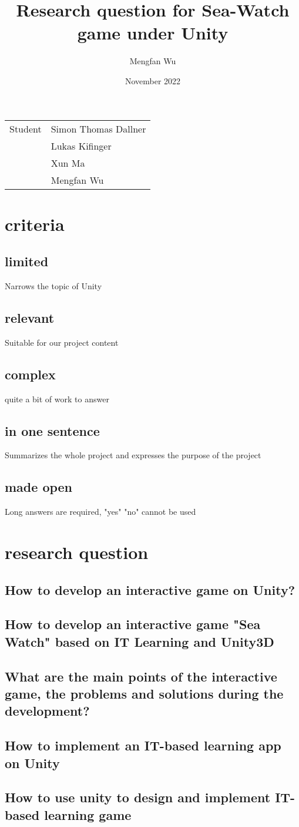 \documentclass{article}
\title{Research question for Sea-Watch game under Unity
}
\author{Mengfan Wu}
\date{November 2022}
\begin{document}
\maketitle

\noindent\begin{tabular}{@{}ll}
    Student &  Simon Thomas Dallner \\& Lukas Kifinger \\&  Xun Ma \\& Mengfan Wu
     
\end{tabular}

\section{criteria}

\subsection{limited}
Narrows the topic of Unity
\subsection{relevant}
Suitable for our project content

\subsection{complex}
quite a bit of work to answer

\subsection{in one sentence}
Summarizes the whole project and expresses the purpose of the project

\subsection{made open}
Long answers are required, "yes" "no" cannot be used


\section{research question}
\subsection{How to develop an interactive game on Unity?}

\subsection{How to develop an interactive game "Sea Watch" based on IT Learning and Unity3D}

\subsection{What are the main points of the interactive game, the problems and solutions during the development? }

\subsection{How to implement an IT-based learning app on Unity}
\subsection{How to use unity to design and implement IT-based learning game}
\end{document}
